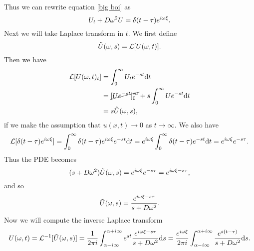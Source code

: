 \documentclass[12pt]{report}
\begin{document}
\begin{solution}
\begin{enumerate}
        Thus we can rewrite equation \ref{big boi} as
        \[ 
            U_t + D {\omega}^2 U = \delta(t - {\tau}) e^{i{\omega}{\xi}}.
        \]
        Next we will take Laplace transform in $t$. We first define
        \[ 
            \tilde{U}({\omega}, s) = {\mathcal{L}}[U({\omega},t)].
        \]
        Then we have
        \begin{align*}
            {\mathcal{L}}[U({\omega},t)_t] &= \int_0^\infty U_t e^{-st} {\mathrm{d}} t\\
            &= \cancel{[U e^{-st}]_0^\infty} + s \int_{0}^{\infty} U e^{-st} {\mathrm{d}} t\\
            &= s \tilde{U}({\omega}, s),
        \end{align*}
        if we make the assumption that $u(x,t) \to 0$ as $t \to \infty$. We also have
        \[ 
            {\mathcal{L}}[\delta(t - {\tau}) e^{i{\omega}{\xi}}] = \int_0^\infty \delta(t - {\tau}) e^{i{\omega}{\xi}} e^{-st} {\mathrm{d}} t = e^{i{\omega}{\xi}} \int_0^\infty \delta(t - {\tau})e^{-st} {\mathrm{d}} t = e^{i{\omega}{\xi}}e^{-s {\tau}}. 
        \]
        Thus the PDE becomes
        \[ 
            (s + D{\omega}^2)\tilde{U}({\omega},s) = e^{i{\omega}{\xi}}e^{-s {\tau}} = e^{i{\omega}{\xi} -s{\tau}},
        \]
        and so
        \[ 
            \tilde{U}({\omega},s) = \frac{e^{i{\omega}{\xi}-s {\tau}}}{s + D{\omega}^2}.  
        \]
        Now we will compute the inverse Laplace transform
        \[ 
            U({\omega},t) = {\mathcal{L}}^{-1}[\tilde{U}({\omega},s)] = \frac{1}{2\pi i }\int_{\alpha-i\infty}^{\alpha+i\infty} e^{st}\frac{e^{i{\omega}{\xi}-s {\tau}}}{s + D{\omega}^2} {\mathrm{d}} s = \frac{e^{i{\omega}\xi}}{2\pi i}\int_{\alpha-i\infty}^{\alpha + i\infty}  \frac{e^{s(t-\tau)}}{s + D{\omega}^2} {\mathrm{d}} s. 
        \]
        \begin{figure}[H]
            \center
\end{figure}
\end{enumerate}
\end{solution}
\end{document}
